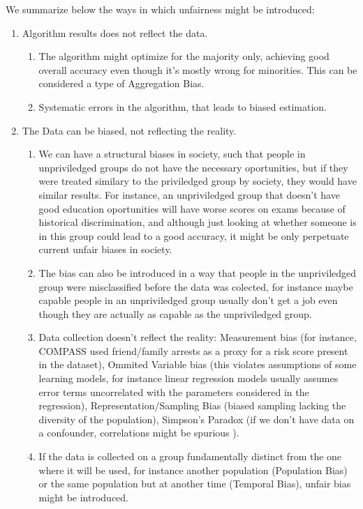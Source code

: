 We summarize below the ways in which unfairness might be introduced:

\begin{enumerate}
\item Algorithm results does not reflect the data.
    \begin{enumerate}
    \item The algorithm might optimize for the majority only, achieving good overall accuracy even though it's mostly wrong for minorities. This can be considered a type of Aggregation Bias.
    \item Systematic errors in the algorithm, that leads to biased estimation.
    \end{enumerate}
\item The Data can be biased, not reflecting the reality.
    \begin{enumerate}
    \item We can have a structural biases in society, such that people in unpriviledged groups do not have the necessary oportunities, but if they were treated similary to the priviledged group by society, they would have similar results. For instance, an unpriviledged group that doesn't have good education oportunities will have worse scores on exams because of historical discrimination, and although just looking at whether someone is in this group could lead to a good accuracy, it might be only perpetuate current unfair biases in society.
    \item The bias can also be introduced in a way that people in the unpriviledged group were misclassified before the data was colected, for instance maybe capable people in an unpriviledged group usually don't get a job even though they are actually as capable as the unpriviledged group.
    \item Data collection doesn't reflect the reality: Measurement bias (for instance, COMPASS used friend/family arrests as a proxy for a risk score present in the dataset), Ommited Variable bias (this violates assumptions of some learning models, for instance linear regression models usually assumes error terms uncorrelated with the parameters considered in the regression), Representation/Sampling Bias (biased sampling lacking the diversity of the population), Simpson's Paradox (if we don't have data on a confounder, correlations might be spurious \cite{Causality}).
    \item If the data is collected on a group fundamentally distinct from the one where it will be used, for instance another population (Population Bias) or the same population but at another time (Temporal Bias), unfair bias might be introduced.

\end{enumerate}
\end{enumerate}
